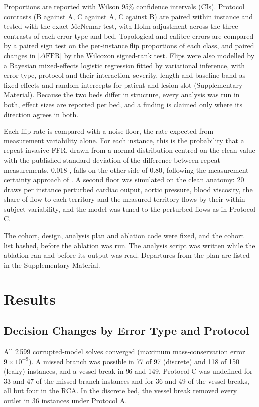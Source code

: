 \documentclass[journal]{IEEEtran}
\begin{document}
Proportions are reported with Wilson 95\% confidence intervals (CIs). Protocol contrasts (B against A, C against A,
C against B) are paired within instance and tested with the exact McNemar test, with Holm adjustment across the
three contrasts of each error type and bed. Topological and calibre errors are compared by a paired sign test on
the per-instance flip proportions of each class, and paired changes in $|\Delta\mathrm{FFR}|$ by the Wilcoxon
signed-rank test. Flips were also modelled by a Bayesian mixed-effects logistic regression fitted by variational
inference, with error type, protocol and their interaction, severity, length and baseline band as fixed effects and
random intercepts for patient and lesion slot (Supplementary Material). Because the two beds differ in structure,
every analysis was run in both, effect sizes are reported per bed, and a finding is claimed only where its
direction agrees in both.

Each flip rate is compared with a noise floor, the rate expected from measurement variability alone. For each instance, this is the probability that a repeat invasive FFR, drawn from a normal
distribution centred on the clean value with the published standard deviation of the difference between repeat measurements, 0.018 \cite{johnson2015}, falls on the other side of 0.80, following the measurement-certainty approach of \cite{petraco2013}. A second floor was simulated on the clean anatomy: 20 draws
per instance perturbed cardiac output, aortic pressure, blood viscosity, the share of flow to each territory and the
measured territory flows by their within-subject variability, and the model was tuned to the perturbed flows as in
Protocol C.

The cohort, design, analysis plan and ablation code were fixed, and the cohort list hashed, before the ablation was
run. The analysis script was written while the ablation ran and before its output was read. Departures from the
plan are listed in the Supplementary Material.

\section{Results}
\subsection{Decision Changes by Error Type and Protocol}
All 2\,599 corrupted-model solves converged (maximum mass-conservation error $9\times10^{-9}$). A missed branch
was possible in 77 of 97 (discrete) and 118 of 150 (leaky) instances, and a vessel break in 96 and 149. Protocol C was undefined for 33 and 47 of the
missed-branch instances and for 36 and 49 of the vessel breaks, all but four in the RCA. In the discrete bed, the
vessel break removed every outlet in 36 instances under Protocol A.
\end{document}
